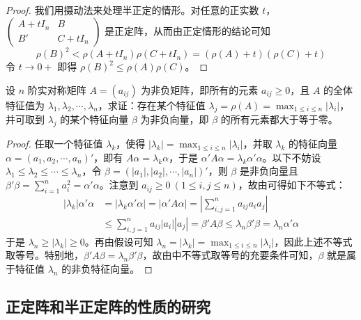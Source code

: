 \documentclass[../../main.tex]{subfiles}
\begin{document}
\begin{proof}
我们用摄动法来处理半正定的情形。对任意的正实数 \(t\)，\(\begin{pmatrix}
A + tI_n & B \\
B' & C + tI_n
\end{pmatrix}\) 是正定阵，从而由正定情形的结论可知
\[
\rho(B)^2 < \rho(A + tI_n)\rho(C + tI_n) = (\rho(A) + t)(\rho(C) + t)
\]
令 \(t \to 0+\) 即得 \(\rho(B)^2 \leqslant  \rho(A)\rho(C)\)。 

\end{proof}

\begin{proposition}\label{proposition:例9.58}
设 \(n\) 阶实对称矩阵 \(A = (a_{ij})\) 为非负矩阵，即所有的元素 \(a_{ij} \geqslant  0\)，且 \(A\) 的全体特征值为 \(\lambda_1,\lambda_2,\cdots,\lambda_n\)，求证：存在某个特征值 \(\lambda_j = \rho(A) = \max_{1\leqslant  i \leqslant  n}|\lambda_i|\)，并可取到 \(\lambda_j\) 的某个特征向量 \(\beta\) 为非负向量，即 \(\beta\) 的所有元素都大于等于零。
\end{proposition}
\begin{proof}
任取一个特征值 \(\lambda_k\)，使得 \(|\lambda_k| = \max_{1\leqslant  i \leqslant  n}|\lambda_i|\)，并取 \(\lambda_k\) 的特征向量 \(\alpha = (a_1,a_2,\cdots,a_n)'\)，即有 \(A\alpha = \lambda_k\alpha\)，于是 \(\alpha'A\alpha = \lambda_k\alpha'\alpha\)。以下不妨设 \(\lambda_1 \leqslant  \lambda_2 \leqslant  \cdots \leqslant  \lambda_n\)，令 \(\beta = (|a_1|,|a_2|,\cdots,|a_n|)'\)，则 \(\beta\) 是非负向量且 \(\beta'\beta = \sum_{i = 1}^{n}a_i^2 = \alpha'\alpha\)。注意到 \(a_{ij} \geqslant  0\ (1\leqslant  i,j \leqslant  n)\)，故由可得如下不等式：
\begin{align*}
|\lambda_k|\alpha'\alpha &= |\lambda_k\alpha'\alpha| = |\alpha'A\alpha| = \left|\sum_{i,j = 1}^{n}a_{ij}a_ia_j\right|\\
&\leqslant  \sum_{i,j = 1}^{n}a_{ij}|a_i||a_j| = \beta'A\beta \leqslant  \lambda_n\beta'\beta = \lambda_n\alpha'\alpha
\end{align*}
于是 \(\lambda_n \geqslant  |\lambda_k| \geqslant  0\)。再由假设可知 \(\lambda_n = |\lambda_k| = \max_{1\leqslant  i \leqslant  n}|\lambda_i|\)，因此上述不等式取等号。特别地，\(\beta'A\beta = \lambda_n\beta'\beta\)，故由中不等式取等号的充要条件可知，\(\beta\) 就是属于特征值 \(\lambda_n\) 的非负特征向量。 

\end{proof}


\subsection{正定阵和半正定阵的性质的研究}
\end{document}
